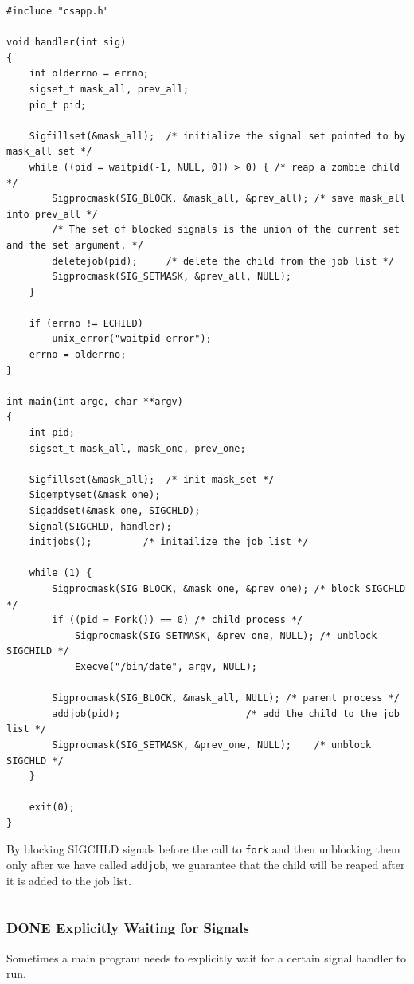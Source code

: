 \documentclass[11pt]{article}
\begin{document}
\begin{verbatim}
#include "csapp.h"

void handler(int sig)
{
    int olderrno = errno;
    sigset_t mask_all, prev_all;
    pid_t pid;

    Sigfillset(&mask_all);	/* initialize the signal set pointed to by mask_all set */
    while ((pid = waitpid(-1, NULL, 0)) > 0) { /* reap a zombie child */
        Sigprocmask(SIG_BLOCK, &mask_all, &prev_all); /* save mask_all into prev_all */
        /* The set of blocked signals is the union of the current set and the set argument. */
        deletejob(pid);		/* delete the child from the job list */
        Sigprocmask(SIG_SETMASK, &prev_all, NULL);
    }

    if (errno != ECHILD)
        unix_error("waitpid error");
    errno = olderrno;
}

int main(int argc, char **argv)
{
    int pid;
    sigset_t mask_all, mask_one, prev_one;

    Sigfillset(&mask_all);	/* init mask_set */
    Sigemptyset(&mask_one);
    Sigaddset(&mask_one, SIGCHLD);
    Signal(SIGCHLD, handler);
    initjobs();			/* initailize the job list */

    while (1) {
        Sigprocmask(SIG_BLOCK, &mask_one, &prev_one); /* block SIGCHLD */
        if ((pid = Fork()) == 0) /* child process */
            Sigprocmask(SIG_SETMASK, &prev_one, NULL); /* unblock SIGCHILD */
            Execve("/bin/date", argv, NULL);

        Sigprocmask(SIG_BLOCK, &mask_all, NULL); /* parent process */
        addjob(pid);				      /* add the child to the job list */
        Sigprocmask(SIG_SETMASK, &prev_one, NULL);    /* unblock SIGCHLD */
    }

    exit(0);
}

\end{verbatim}

By blocking SIGCHLD signals before the call to \texttt{fork} and then unblocking them only after we have called \texttt{addjob}, we guarantee that the child will be reaped after it is added to the job list.\\

\noindent\rule{\textwidth}{0.5pt}
\subsubsection{{\bfseries\sffamily DONE} Explicitly Waiting for Signals}
\label{sec:orged3404a}
Sometimes a main program needs to explicitly wait for a certain signal handler to run.\\
\end{document}

